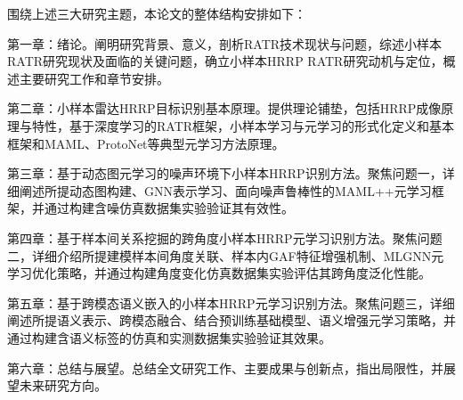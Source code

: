 围绕上述三大研究主题，本论文的整体结构安排如下：

第一章：绪论。阐明研究背景、意义，剖析RATR技术现状与问题，综述小样本RATR研究现状及面临的关键问题，确立小样本HRRP RATR研究动机与定位，概述主要研究工作和章节安排。

第二章：小样本雷达HRRP目标识别基本原理。提供理论铺垫，包括HRRP成像原理与特性，基于深度学习的RATR框架，小样本学习与元学习的形式化定义和基本框架和MAML、ProtoNet等典型元学习方法原理。

第三章：基于动态图元学习的噪声环境下小样本HRRP识别方法。聚焦问题一，详细阐述所提动态图构建、GNN表示学习、面向噪声鲁棒性的MAML++元学习框架，并通过构建含噪仿真数据集实验验证其有效性。

第四章：基于样本间关系挖掘的跨角度小样本HRRP元学习识别方法。聚焦问题二，详细介绍所提建模样本间角度关联、样本内GAF特征增强机制、MLGNN元学习优化策略，并通过构建角度变化仿真数据集实验评估其跨角度泛化性能。

第五章：基于跨模态语义嵌入的小样本HRRP元学习识别方法。聚焦问题三，详细阐述所提语义表示、跨模态融合、结合预训练基础模型、语义增强元学习策略，并通过构建含语义标签的仿真和实测数据集实验验证其效果。

第六章：总结与展望。总结全文研究工作、主要成果与创新点，指出局限性，并展望未来研究方向。